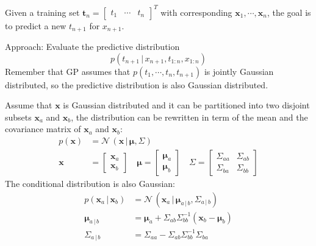 \documentclass[a4paper, 11pt, accentcolor = tud3b]{tudreport}
\newcommand{\given}{\ensuremath{\,\vert\,}}
\renewcommand{\vec}[1]{\mathbf{#1}}
\begin{document}
				Given a training set \( \vec{t}_n = \begin{bmatrix} t_1 & \cdots & t_n \end{bmatrix}^T \) with corresponding \( \vec{x}_1, \cdots, \vec{x}_n \), the goal is to predict a new \( t_{n + 1} \) for \( x_{n + 1} \).
				
				Approach: Evaluate the predictive distribution
				\begin{equation}
					p(t_{n + 1} \given x_{n + 1}, t_{1:n}, x_{1:n})
				\end{equation}
				Remember that GP assumes that \( p(t_1, \cdots, t_n, t_{n + 1}) \) is jointly Gaussian distributed, so the predictive distribution is also Gaussian distributed.
				
				Assume that \(\vec{x}\) is Gaussian distributed and it can be partitioned into two disjoint subsets \( \vec{x}_a \) and \( \vec{x}_b \), the distribution can be rewritten in term of the mean and the covariance matrix of \(\vec{x}_a\) and \(\vec{x}_b\):
				\begin{align}
					p(\vec{x}) &= \mathcal{N}\,(\vec{x} \given \vec{\mu}, \Sigma) \\
						\vec{x} &= \begin{bmatrix} \vec{x}_a \\ \vec{x}_b \end{bmatrix} \quad \vec{\mu} = \begin{bmatrix} \vec{\mu}_a \\ \vec{\mu}_b \end{bmatrix} \quad \Sigma = \begin{bmatrix} \Sigma_{aa} & \Sigma_{ab} \\ \Sigma_{ba} & \Sigma_{bb} \end{bmatrix}
				\end{align}
				The conditional distribution is also Gaussian:
				\begin{align}
					p(\vec{x}_a \given \vec{x}_b) &= \mathcal{N}\,(\vec{x}_a \given \vec{\mu}_{a \given b}, \Sigma_{a \given b}) \\
						\vec{\mu}_{a \given b} &= \vec{\mu}_a + \Sigma_{ab} \Sigma_{bb}^{-1} (\vec{x}_b - \vec{\mu}_b) \\
						\Sigma_{a \given b} &= \Sigma_{aa} - \Sigma_{ab} \Sigma_{bb}^{-1} \Sigma_{ba}
				\end{align}
				
\end{document}
